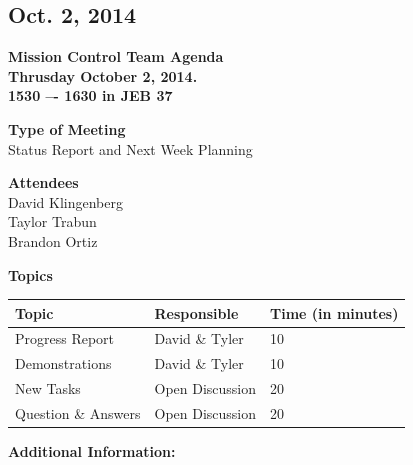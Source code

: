 \documentclass[pdftex,11pt]{article}
\begin{document}
\clearpage

\subsection{Oct. 2, 2014}
{ \huge \bfseries Mission Control Team Agenda \\[0.4cm] }
{ \huge \bfseries Thrusday October 2, 2014.\\1530 –-  1630  in JEB 37\\[0.4cm] }
\vspace*{2.5mm}

{ \large \bfseries \hspace*{2 mm} Type of Meeting\\}
\hspace*{12 mm}  Status Report and  Next Week Planning
\vspace*{1.5mm}

{ \large \bfseries \hspace*{2 mm} Attendees\\}
\hspace*{12mm} David Klingenberg\\
\hspace*{12mm} Taylor Trabun\\
\hspace*{12mm} Brandon Ortiz\\
\vspace*{1.5mm}

{ \large \bfseries \noindent Topics}
\vspace*{2.5mm}

\begin{tabular}{| l | l | l |}
  \hline
  \bfseries Topic & \bfseries Responsible & \bfseries Time (in minutes) \\ \hline
  Progress Report  & David \& Tyler &  10 \\ \hline
  Demonstrations & David \& Tyler & 10 \\ \hline
  New Tasks & Open Discussion & 20 \\ \hline
  Question \&  Answers  & Open Discussion & 20 \\ 
  \hline
\end{tabular}

\vspace*{2.5mm}
{ \large \bfseries \noindent Additional Information:}
\end{document}
